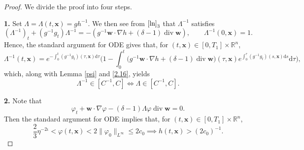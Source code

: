 \documentclass[11pt,reqno]{amsart}
\DeclareMathOperator{\diver}{\mathrm{div}}
\numberwithin{rk}{section}
\numberwithin{prop}{section}
\numberwithin{mydef}{section}
\numberwithin{lem}{section}
\numberwithin{equation}{section}
\numberwithin{thm}{section}
\begin{document}
\begin{proof}
We divide the proof into four steps.

\smallskip
\textbf{1.} Set $\Lambda=\Lambda(t,\boldsymbol{x})=gh^{-1}$. We then see from $\eqref{ln}_3$ that $\Lambda^{-1}$ satisfies
\begin{equation*}
(\Lambda^{-1})_t + (g^{-1}g_t)\Lambda^{-1}=-(g^{-1}\boldsymbol{w}\cdot \nabla h+(\delta-1)\diver \boldsymbol{w}),\qquad \Lambda^{-1}(0,\boldsymbol{x}) =1.
\end{equation*}
Hence,  the standard argument for ODE gives that, for $(t,\boldsymbol{x})\in [0,T_1]\times \mathbb{R}^n$,
\begin{equation*}
\Lambda^{-1} (t,\boldsymbol{x})= e^{-\int_0^t(g^{-1}g_t)(\tau, \boldsymbol{x})\mathrm{d}\tau}\Big(1-\!\int_0^t\! \big(g^{-1}\boldsymbol{w}\cdot \nabla h+(\delta-1)\diver \boldsymbol{w}\big)(\tau, \boldsymbol{x})e^{\int_0^\tau(g^{-1}g_t)(s, \boldsymbol{x})\mathrm{d}s}\mathrm{d}\tau\Big),
\end{equation*}
which, along with  Lemma \ref{psi} and \eqref{2.16}, yields 
\begin{equation}\label{1008}
\Lambda^{-1}\in [C^{-1},C]\iff \Lambda \in [C^{-1},C].
\end{equation} 

\smallskip
\textbf{2.} Note that 
\begin{equation*} 
\varphi_t+\boldsymbol{w}\cdot \nabla \varphi-(\delta-1)\Lambda\varphi\diver \boldsymbol{w}=0.
\end{equation*}
Then the standard argument for ODE implies that, for $(t,\boldsymbol{x})\in [0,T_1]\times \mathbb{R}^n$, 
\begin{equation}\label{2.34d}
\frac{2}{3}\eta^{-2\iota}<\varphi(t,\boldsymbol{x})<2\|\varphi_0\|_{L^\infty}\leq 2c_0\implies h(t,\boldsymbol{x})>(2c_0)^{-1}.
\end{equation}


\end{proof}
\end{document}
